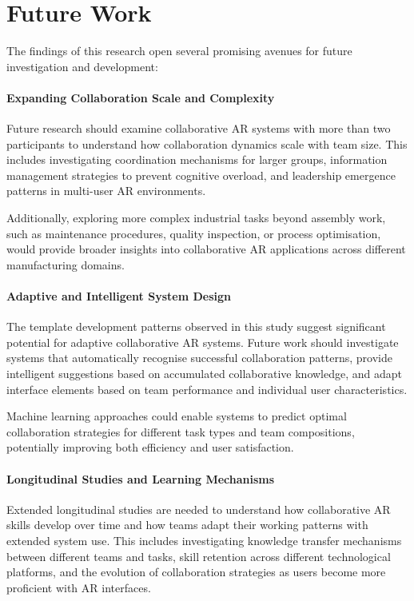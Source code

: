 \section{Future Work}

The findings of this research open several promising avenues for future investigation and development:

\paragraph{Expanding Collaboration Scale and Complexity}
Future research should examine collaborative AR systems with more than two participants to understand how collaboration dynamics scale with team size. This includes investigating coordination mechanisms for larger groups, information management strategies to prevent cognitive overload, and leadership emergence patterns in multi-user AR environments.

Additionally, exploring more complex industrial tasks beyond assembly work, such as maintenance procedures, quality inspection, or process optimisation, would provide broader insights into collaborative AR applications across different manufacturing domains.

\paragraph{Adaptive and Intelligent System Design}
The template development patterns observed in this study suggest significant potential for adaptive collaborative AR systems. Future work should investigate systems that automatically recognise successful collaboration patterns, provide intelligent suggestions based on accumulated collaborative knowledge, and adapt interface elements based on team performance and individual user characteristics.

Machine learning approaches could enable systems to predict optimal collaboration strategies for different task types and team compositions, potentially improving both efficiency and user satisfaction.

\paragraph{Longitudinal Studies and Learning Mechanisms}
Extended longitudinal studies are needed to understand how collaborative AR skills develop over time and how teams adapt their working patterns with extended system use. This includes investigating knowledge transfer mechanisms between different teams and tasks, skill retention across different technological platforms, and the evolution of collaboration strategies as users become more proficient with AR interfaces.

